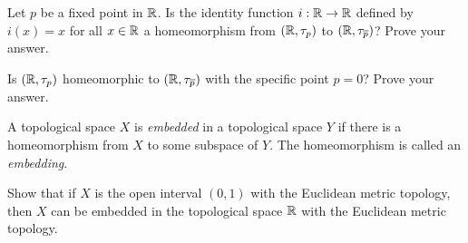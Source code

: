 	\ba
	\item Let $p$ be a fixed point in $\mathbb{R}$. Is the identity function $i: \mathbb{R} \to \mathbb{R}$ defined by $i(x) = x$ for all $x \in \mathbb{R}$ a homeomorphism from $(\mathbb{R}, \tau_p)$ to $(\mathbb{R}, \tau_{\overline{p}})$? Prove your answer.
	
	\item Is $(\mathbb{R}, \tau_{p})$ homeomorphic to $(\mathbb{R}, \tau_{\overline{p}})$ with the specific point $p=0$? Prove your answer. 

	\ea
	
\begin{comment}

\ExerciseSolution

\ba
\item The answer is no because the inverse image of the open set $\{q\}$, where $q \neq p$ in $(\R, \tau_{\overline{p}})$ is not open in $(\R, \tau_p)$. 

\item Suppose $f$ is a bijection from $(\R, \tau_0)$ to $(\R, \tau_{\overline{0}})$.  We consider the cases $f(0) = 0$ and $f(0) \neq 0$. 
\begin{itemize}
\item Suppose $f(0) = 0$. Let $O = \{1\}$. Since $0 \notin O$, we know that $O$ is an open set in $(\R, \tau_{\overline{0}})$. The fact that $f$ is a bijection, $f^{-1}(O) = \{b\}$, where $b \in \R$ and $f(b) = 1$. The fact that $f(0) = 0$ implies that $b \neq 0$. So $0 \notin f^{-1}(O)$ and $f^{-1}(O)$ is not open. We conclude that $f$ is not a continuous function.
\item Suppose $f(0) \neq 0$. Let $b = f(0)$. Let $c \in \R$ with $c \neq 0$ and $c \neq b$, and let $O = \{c\}$. Since $0 \notin O$, we know that $O$ is an open set in $(\R, \tau_{\overline{0}})$. Then $f^{-1}(O) = \{d\}$ where $d \in \R$ and $f(d) = c$. The fact that $f(0) =b \neq c$ implies that $d \neq 0$. So $0 \notin f^{-1}(O)$ and $f^{-1}(O)$ is not open. We conclude that $f$ is not a continuous function.
\end{itemize}
So there can be no continuous bijection from $(\R, \tau_{p})$ to $(\R, \tau_{\overline{p}})$, we conclude that these two spaces are not homeomorphic. 
\ea

\end{comment}

\item A topological space $X$ is \emph{embedded} in a topological space $Y$ if there is a homeomorphism from $X$ to some subspace of $Y$. The homeomorphism is called an \emph{embedding}.
	\ba
	\item Show that if $X$ is the open interval $(0,1)$ with the Euclidean metric topology, then $X$ can be embedded in the topological space $\mathbb{R}$ with the Euclidean metric topology.
	
